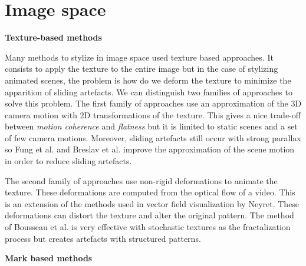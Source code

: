 \section{Image space}

\textbf{Texture-based methods}

Many methods to stylize in image space used texture based approaches. It consists to apply the texture to the entire image \cite{benard_state---art_2011} but in the case of stylizing animated scenes, the problem is how do we deform the texture to minimize the apparition of sliding artefacts. We can distinguish two families of approaches to solve this problem. The first family of approaches use an approximation of the 3D camera motion with 2D transformations of the texture\cite{cunzi_dynamic_nodate}. This gives a nice trade-off between \textit{motion coherence} and \textit{flatness} but it is limited to static scenes and a set of few camera motions. Moreover, sliding artefacts still occur with strong parallax so Fung et al.\cite{fung_pen-and-ink_nodate} and Breslav et al.\cite{breslav_dynamic_nodate} improve the approximation of the scene motion in order to reduce sliding artefacts.

The second family of approaches use non-rigid deformations to animate the texture\cite{bousseau_video_2007}. These deformations are computed from the optical flow of a video. This is an extension of the methods used in vector field visualization by Neyret\cite{neyret_imagis-gravir_nodate}. These deformations can distort the texture and alter the original pattern. The method of Bousseau et al.\cite{bousseau_video_2007} is very effective with stochastic textures as the fractalization process but creates artefacts with structured patterns. \newline



\textbf{Mark based methods}

